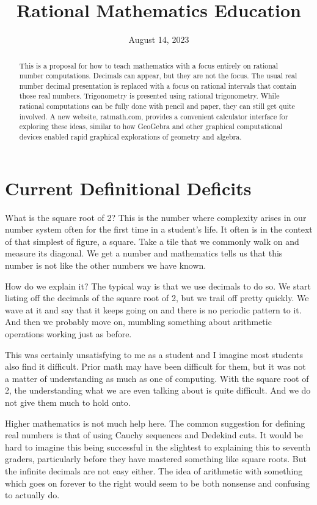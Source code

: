 \documentclass[12pt]{article}
\title{Rational Mathematics Education}
\date{August 14, 2023}
\begin{document}
\maketitle
\begin{abstract}
This is a proposal for how to teach mathematics with a focus entirely on rational number computations. Decimals can appear, but they are not the focus. The usual real number decimal presentation is replaced with a focus on rational intervals that contain those real numbers. Trigonometry is presented using rational trigonometry. While rational computations can be fully done with pencil and paper, they can still get quite involved. A new website, ratmath.com, provides a convenient calculator interface for exploring these ideas, similar to how GeoGebra and other graphical computational devices enabled rapid graphical explorations of geometry and algebra. 
\end{abstract}

\tableofcontents

\section{Current Definitional Deficits}

What is the square root of 2? This is the number where complexity arises in our number system often for the first time in a student's life. It often is in the context of that simplest of figure, a square. Take a tile that we commonly walk on and measure its diagonal. We get a number and mathematics tells us that this number is not like the other numbers we have known. 

How do we explain it? The typical way is that we use decimals to do so. We start listing off the decimals of the square root of 2, but we trail off pretty quickly. We wave at it and say that it keeps going on and there is no periodic pattern to it. And then we probably move on, mumbling something about arithmetic operations working just as before. 

This was certainly unsatisfying to me as a student and I imagine most students also find it difficult. Prior math may have been difficult for them, but it was not a matter of understanding as much as one of computing. With the square root of 2, the understanding what we are even talking about is quite difficult. And we do not give them much to hold onto. 

Higher mathematics is not much help here. The common suggestion for defining real numbers is that of using Cauchy sequences and Dedekind cuts. It would be hard to imagine this being successful in the slightest to explaining this to seventh graders, particularly before they have mastered something like square roots. But the infinite decimals are not easy either. The idea of arithmetic with something which goes on forever to the right would seem to be both nonsense and confusing to actually do. 
\end{document}
